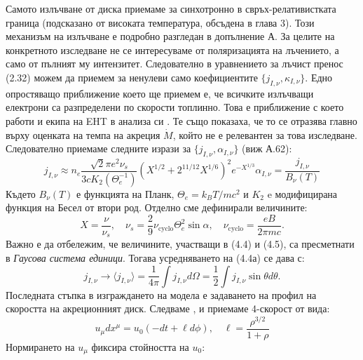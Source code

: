 \documentclass[12pt]{article}
\numberwithin{equation}{section}
\numberwithin{figure}{section}
\begin{document}
	Самото излъчване от диска приемаме за синхотронно в свръх-релативистката граница (подсказано от високата температура, обсъдена в глава 3). Този механизъм на излъчване е подробно разгледан в допълнение А. За целите на конкретното изследване не се интересуваме от поляризацията на лъчението, а само от пълният му интензитет. Следователно в уравнението за лъчист пренос (2.32) можем да приемем за ненулеви само коефициентите $\{j_{I,\nu}, \kappa_{I,\nu}\}.$ Едно опростяващо приближение което ще приемем е, че всичките излъчващи електрони са разпределени по скорости топлинно. Това е приближение с което работи и екипа на EHT в анализа си \cite{EHT_M87_VIII}. Те също показаха, че то се отразява главно върху оценката на темпа на акреция $\dot{M}$, който не е релевантен за това изследване. Следователно приемаме следните изрази за $\{j_{I,\nu}, \alpha_{I,\nu}\}$ (виж А.62):
	\begin{subequations}
		\begin{equation}
			j_{I,\nu}\approx n_e \frac{\sqrt{2}\pi e^2\nu_s}{3cK_2(\Theta_e^{-1})}\left(X^{1/2} + 2^{11/12}X^{1/6}\right)^2 e^{-X^{1/3}}
		\end{equation}
		\begin{equation}
			\alpha_{I,\nu} = \frac{j_{I,\nu}}{B_\nu(T)}
		\end{equation}
	\end{subequations}
	Където $B_\nu(T)$ е функцията на Планк, $\Theta_e = k_BT/mc^2$ и $K_2$ e модифицирана функция на Бесел от втори род. Отделно сме дефинирали величините:
	\begin{equation}
		X = \frac{\nu}{\nu_s},\quad \nu_s = \frac{2}{9}\nu_\text{cyclo}\Theta_e^2\sin\alpha, \quad \nu_\text{cyclo} = \frac{eB}{2\pi m c}.
	\end{equation}
	Важно е да отбележим, че величините, участващи в (4.4) и (4.5), са пресметнати в \emph{Гаусова система единици}. Тогава усредняването на (4.4а) се дава с:
	\begin{equation}
		j_{I,\nu}\rightarrow\langle j_{I,\nu} \rangle = \frac{1}{4\pi}\int j_{I,\nu} d\Omega = \frac{1}{2}\int j_{I,\nu} \sin\theta d\theta.
	\end{equation}
	Последната стъпка в изграждането на модела е задаването на профил на скоростта на акреционният диск. Следваме \cite{Broderick2021}, \cite{Gold2020} и приемаме 4-скорост от вида:
	\begin{equation}
		u_\mu dx^\mu = u_0(-dt + \ell d\phi),\quad \ell = \frac{\rho^{3/2}}{1 +\rho}
	\end{equation}
	Нормирането на $u_\mu$ фиксира стойността на $u_0$:
\end{document}
